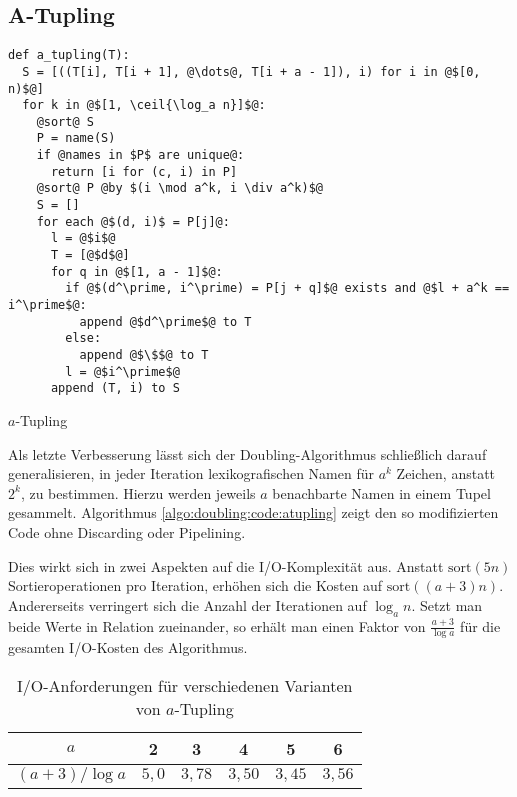 \subsection{A-Tupling}
\label{algo:doubling:sec:tupling}
\begin{listing}[htp]
\begin{verbatim}
def a_tupling(T):
  S = [((T[i], T[i + 1], @\dots@, T[i + a - 1]), i) for i in @$[0, n)$@]
  for k in @$[1, \ceil{\log_a n}]$@:
    @sort@ S
    P = name(S)
    if @names in $P$ are unique@:
      return [i for (c, i) in P]
    @sort@ P @by $(i \mod a^k, i \div a^k)$@
    S = []
    for each @$(d, i)$ = P[j]@:
      l = @$i$@
      T = [@$d$@]
      for q in @$[1, a - 1]$@:
        if @$(d^\prime, i^\prime) = P[j + q]$@ exists and @$l + a^k == i^\prime$@:
          append @$d^\prime$@ to T
        else:
          append @$\$$@ to T
        l = @$i^\prime$@
      append (T, i) to S
\end{verbatim}
\caption{$a$-Tupling} 
\label{algo:doubling:code:atupling}
\end{listing}

Als letzte Verbesserung lässt sich der Doubling-Algorithmus schließlich darauf generalisieren, in jeder Iteration lexikografischen Namen für $a^k$ Zeichen, anstatt $2^k$, zu bestimmen. Hierzu werden jeweils $a$ benachbarte Namen in einem Tupel gesammelt. Algorithmus \ref{algo:doubling:code:atupling} zeigt den so modifizierten Code ohne Discarding oder Pipelining.

Dies wirkt sich in zwei Aspekten auf die I/O-Komplexität aus. Anstatt $\text{sort}(5n)$ Sortieroperationen pro Iteration, erhöhen sich die Kosten auf $\text{sort}((a+3)n)$. Andererseits verringert sich die Anzahl der Iterationen auf $\log_a n$. Setzt man beide Werte in Relation zueinander, so erhält man einen Faktor von $\frac{a + 3}{\log a}$ für die gesamten I/O-Kosten des Algorithmus. 

\begin{table}
\centering
\begin{tabular}{cccccc}
\toprule
$a$ & 2 & 3 & 4 & 5 & 6 \\ 
\midrule 
$(a+3) / \log a$ & $5,0$ & $3,78$ & $3,50$ & $3,45$ & $3,56$ \\ 
\bottomrule
\end{tabular} 
\caption{I/O-Anforderungen für verschiedenen Varianten von $a$-Tupling}
\label{algo:doubling:tab:tab1}
\end{table}

